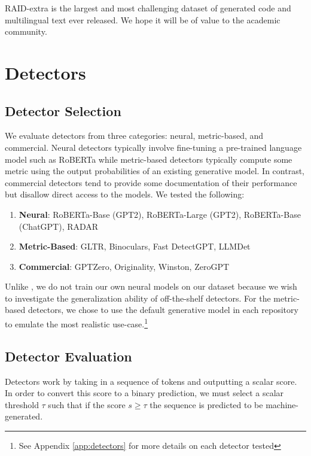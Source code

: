 \documentclass[11pt]{article}
\begin{document}
RAID-extra is the largest and most challenging dataset of generated code and multilingual text ever released. We hope it will be of value to the academic community.

\section{Detectors}
\label{sec:detectors}
\subsection{Detector Selection} 
We evaluate detectors from three categories: neural, metric-based, and commercial. Neural detectors typically involve fine-tuning a pre-trained language model such as RoBERTa \cite{liu2019roberta} while metric-based detectors typically compute some metric using the output probabilities of an existing generative model. 
In contrast, commercial detectors tend to provide some documentation of their performance but disallow direct access to the models. We tested the following:

\renewcommand{\theenumi}{\textbf{(\roman{enumi})}}
\begin{enumerate}[noitemsep]
    \item \textbf{Neural}: RoBERTa-Base (GPT2), RoBERTa-Large (GPT2), RoBERTa-Base (ChatGPT), RADAR
    \item \textbf{Metric-Based}: GLTR, Binoculars, Fast DetectGPT, LLMDet
    \item \textbf{Commercial}: GPTZero, Originality, Winston, ZeroGPT
\end{enumerate}

Unlike \citet{li2024mage}, we do not train our own neural models on our dataset because we wish to investigate the generalization ability of off-the-shelf detectors. For the metric-based detectors, we chose to use the default generative model in each repository to emulate the most realistic use-case.\footnote{See Appendix \ref{app:detectors} for more details on each detector tested}

\subsection{Detector Evaluation}
Detectors work by taking in a sequence of tokens and outputting a scalar score. In order to convert this score to a binary prediction, we must select a scalar threshold $\tau$ such that if the score $s \geq \tau$ the sequence is predicted to be machine-generated. 
\end{document}
